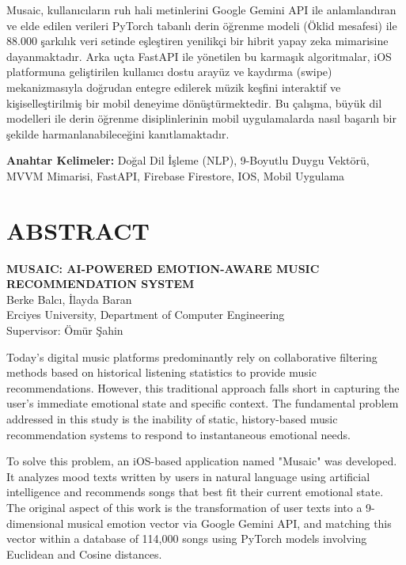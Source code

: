 \documentclass[12pt, a4paper]{report}
\begin{document}
Musaic, kullanıcıların ruh hali metinlerini Google Gemini API ile anlamlandıran ve elde edilen verileri PyTorch tabanlı derin öğrenme modeli (Öklid mesafesi) ile 88.000 şarkılık veri setinde eşleştiren yenilikçi bir hibrit yapay zeka mimarisine dayanmaktadır. Arka uçta FastAPI ile yönetilen bu karmaşık algoritmalar, iOS platformuna geliştirilen kullanıcı dostu arayüz ve kaydırma (swipe) mekanizmasıyla doğrudan entegre edilerek müzik keşfini interaktif ve kişiselleştirilmiş bir mobil deneyime dönüştürmektedir. Bu çalışma, büyük dil modelleri ile derin öğrenme disiplinlerinin mobil uygulamalarda nasıl başarılı bir şekilde harmanlanabileceğini kanıtlamaktadır.

\vspace{0.5cm}
\textbf{Anahtar Kelimeler:} Doğal Dil İşleme (NLP), 9-Boyutlu Duygu Vektörü, MVVM Mimarisi, FastAPI, Firebase Firestore, IOS, Mobil Uygulama

\newpage
{}
{}
\chapter*{ABSTRACT}

\begin{center}
  {\large\bfseries MUSAIC: AI-POWERED EMOTION-AWARE MUSIC RECOMMENDATION SYSTEM}\\[0.5cm]
  Berke Balcı, İlayda Baran\\[0.3cm]
  Erciyes University, Department of Computer Engineering\\[0.3cm]
  Supervisor: Ömür Şahin
\end{center}

\vspace{0.5cm}
Today's digital music platforms predominantly rely on collaborative filtering methods based on historical listening statistics to provide music recommendations. However, this traditional approach falls short in capturing the user's immediate emotional state and specific context. The fundamental problem addressed in this study is the inability of static, history-based music recommendation systems to respond to instantaneous emotional needs.

To solve this problem, an iOS-based application named "Musaic" was developed. It analyzes mood texts written by users in natural language using artificial intelligence and recommends songs that best fit their current emotional state. The original aspect of this work is the transformation of user texts into a 9-dimensional musical emotion vector via Google Gemini API, and matching this vector within a database of 114,000 songs using PyTorch models involving Euclidean and Cosine distances.
\end{document}
